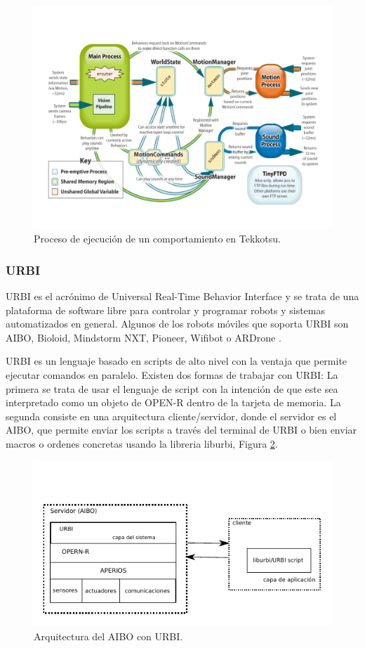 \documentclass[12pt,a4paper,final,twoside]{book}
\begin{document}
 
\begin{figure}[h!]
	\centering
    \includegraphics[scale=0.3]{images/tekkotsuarch.pdf}
	 \caption{Proceso de ejecución de un comportamiento en Tekkotsu.}
  \label{fig:tekkarch}
\end{figure}

\subsubsection{URBI}
\label{urbi}
URBI es el acrónimo de Universal Real-Time Behavior Interface y se trata de una plataforma de software libre para controlar y programar robots y sistemas automatizados en general. Algunos de los robots móviles que soporta URBI son AIBO, Bioloid, Mindstorm NXT, Pioneer, Wifibot o ARDrone \cite{urbi}.

URBI es un lenguaje basado en scripts de alto nivel con la ventaja que permite ejecutar comandos en paralelo. Existen dos formas de trabajar con URBI: La primera  se trata de usar el lenguaje de script con la intención de que este sea interpretado como un objeto de OPEN-R dentro de la tarjeta de memoria. La segunda consiste en una arquitectura cliente/servidor, donde el servidor es el AIBO, que permite enviar los scripts a través del terminal de URBI o bien enviar macros o ordenes concretas usando la libreria liburbi, Figura \ref{fig:urbiarc}. 

\begin{figure}[h!]
	\centering
    \includegraphics[scale=1.4]{images/urbiarc.pdf}
	 \caption{Arquitectura del AIBO con URBI.}
  \label{fig:urbiarc}
\end{figure}
\end{document}
